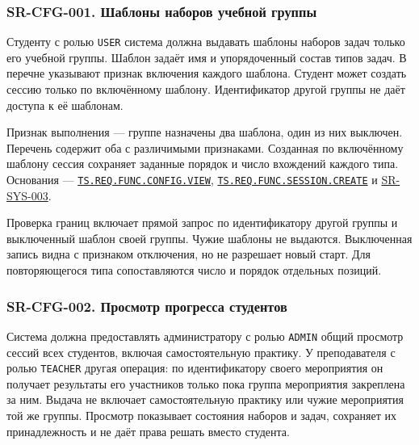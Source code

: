 \documentclass[12pt,a4paper]{article}
\begin{document}
\subsubsection{SR-CFG-001. Шаблоны наборов учебной группы}\label{sr-cfg-001-ux448ux430ux431ux43bux43eux43dux44b-ux43dux430ux431ux43eux440ux43eux432-ux443ux447ux435ux431ux43dux43eux439-ux433ux440ux443ux43fux43fux44b}

\hypertarget{sr-cfg-001-шаблоны-наборов-учебной-группы}{}

\hypertarget{sr-cfg-001}{}

Студенту с ролью \texttt{USER} система должна выдавать шаблоны наборов задач только его учебной группы. Шаблон задаёт имя и упорядоченный состав типов задач. В перечне указывают признак включения каждого шаблона. Студент может создать сессию только по включённому шаблону. Идентификатор другой группы не даёт доступа к её шаблонам.

Признак выполнения --- группе назначены два шаблона, один из них выключен. Перечень содержит оба с различимыми признаками. Созданная по включённому шаблону сессия сохраняет заданные порядок и число вхождений каждого типа. Основания --- {\href{../02\_Техническое\_задание/Техническое\_задание.pdf\#ts-req-func-config-view}{\texttt{TS.\allowbreak{}REQ.\allowbreak{}FUNC.\allowbreak{}CONFIG.\allowbreak{}VIEW}}}, {\href{../02\_Техническое\_задание/Техническое\_задание.pdf\#ts-req-func-session-create}{\texttt{TS.\allowbreak{}REQ.\allowbreak{}FUNC.\allowbreak{}SESSION.\allowbreak{}CREATE}}} и {\hyperlink{sr-sys-003}{SR-SYS-003}}.

Проверка границ включает прямой запрос по идентификатору другой группы и выключенный шаблон своей группы. Чужие шаблоны не выдаются. Выключенная запись видна с признаком отключения, но не разрешает новый старт. Для повторяющегося типа сопоставляются число и порядок отдельных позиций.

\subsubsection{SR-CFG-002. Просмотр прогресса студентов}\label{sr-cfg-002-ux43fux440ux43eux441ux43cux43eux442ux440-ux43fux440ux43eux433ux440ux435ux441ux441ux430-ux441ux442ux443ux434ux435ux43dux442ux43eux432}

\hypertarget{sr-cfg-002-просмотр-прогресса-студентов}{}

\hypertarget{sr-cfg-002}{}

Система должна предоставлять администратору с ролью \texttt{ADMIN} общий просмотр сессий всех студентов, включая самостоятельную практику. У преподавателя с ролью \texttt{TEACHER} другая операция: по идентификатору своего мероприятия он получает результаты его участников только пока группа мероприятия закреплена за ним. Выдача не включает самостоятельную практику или чужие мероприятия той же группы. Просмотр показывает состояния наборов и задач, сохраняет их принадлежность и не даёт права решать вместо студента.
\end{document}
